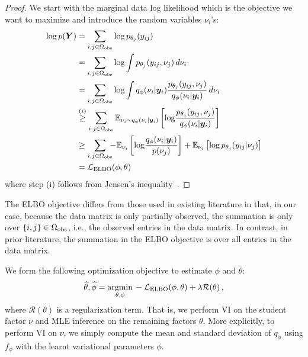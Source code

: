 \begin{proof}
    We start with the marginal data log likelihood which is the objective we want to maximize and introduce the random variables $\nu_i$'s:
    \begin{align}
        {\rm log}\,p({\bm{Y}}) & = \sum_{i,j\in\Omega_{\rm obs}} {\rm log}\, p_{\theta_j}(y_{ij}) \nonumber                                                                                                                                        \\
                          & = \sum_{i,j\in\Omega_{\rm obs}} {\rm log}\int p_{\theta_j}(y_{ij}, \nu_j) \,d\nu_i \nonumber                                                                                                                      \\
                          & = \sum_{i,j\in\Omega_{\rm obs}} {\rm log}\int q_\phi(\nu_i|{\bm{y}}_i) \frac{p_{\theta_j}(y_{ij}, \nu_j)}{q_\phi(\nu_i|{\bm{y}}_i)}\,d\nu_i \nonumber                                                                       \\
                          & \overset{(i)}{\geq} \sum_{i,j\in\Omega_{\rm obs}}\mathbb{E}_{\nu_i\sim q_\phi(\nu_i|{\bm{y}}_i)}\left[ {\rm log}\frac{p_{\theta_j}(y_{ij}, \nu_j)}{q_\phi(\nu_i|{\bm{y}}_i)}\right] \nonumber                               \\
                          & \geq \sum_{i,j\in\Omega_{\rm obs}} \hspace{-5pt}- \mathbb{E}_{\nu_i}\left[{\rm log} \frac{q_\phi(\nu_i|{\bm{y}}_i)}{p(\nu_j)}\right] + \mathbb{E}_{\nu_i}\left[ {\rm log}\,p_{\theta_j}(y_{ij}|\nu_j)\right] \nonumber \\
                          & = \mathcal{L}_{\rm ELBO}(\phi,\theta)  \nonumber
    \end{align}
    where step (i) follows from Jensen's inequality~\cite{jensen1906fonctions}.
\end{proof}

The ELBO objective differs from those used in existing literature in that, in
our case, because the data matrix is only partially observed, the summation is
only over $\{i,j\}\in\Omega_{\rm obs}$, i.e., the observed entries in the data
matrix. In contrast, in prior literature, the summation in the ELBO objective
is over all entries in the data matrix.

We form the following optimization objective to estimate $\phi$ and $\theta$:
\begin{align}
    \widehat{\theta}, \widehat{\phi} = \underset{\theta, \phi}{\rm argmin}\, -\mathcal{L}_{\rm ELBO}(\phi, \theta) + \lambda \mathcal{R}(\theta)\,,\label{eq:objective}
\end{align}
where $\mathcal{R}(\theta)$ is a regularization term.
That is, we perform VI on the student factor $\nu$ and MLE inference on the remaining factors $\theta$. More explicitly, to perform VI on $\nu$, we simply compute the mean and standard deviation of $q_\phi$ using $f_\phi$ with the learnt variational parameters $\phi$.
%
